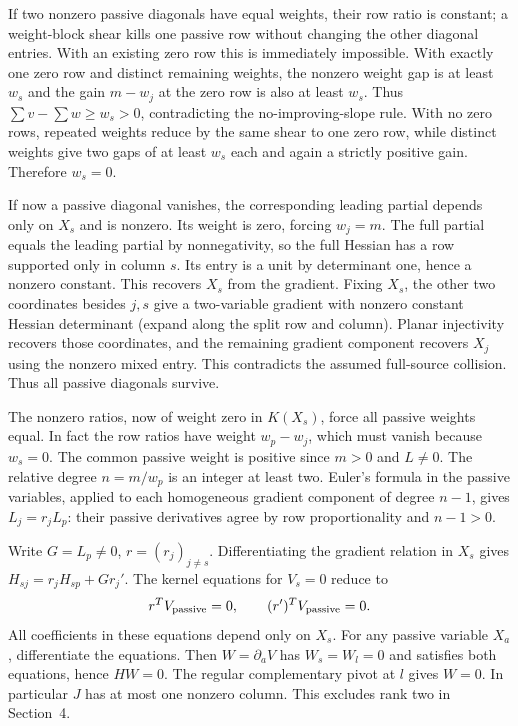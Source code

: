 \documentclass[11pt,a4paper]{article}
\begin{document}
If two nonzero passive diagonals have equal weights, their row ratio is constant; a weight-block shear kills one passive row without changing the other diagonal entries. With an existing zero row this is immediately impossible. With exactly one zero row and distinct remaining weights, the nonzero weight gap is at least $w_s$ and the gain $m-w_j$ at the zero row is also at least $w_s$. Thus $\sum v-\sum w\ge w_s>0$, contradicting the no-improving-slope rule. With no zero rows, repeated weights reduce by the same shear to one zero row, while distinct weights give two gaps of at least $w_s$ each and again a strictly positive gain. Therefore $w_s=0$.

If now a passive diagonal vanishes, the corresponding leading partial depends only on $X_s$ and is nonzero. Its weight is zero, forcing $w_j=m$. The full partial equals the leading partial by nonnegativity, so the full Hessian has a row supported only in column $s$. Its entry is a unit by determinant one, hence a nonzero constant. This recovers $X_s$ from the gradient. Fixing $X_s$, the other two coordinates besides $j,s$ give a two-variable gradient with nonzero constant Hessian determinant (expand along the split row and column). Planar injectivity recovers those coordinates, and the remaining gradient component recovers $X_j$ using the nonzero mixed entry. This contradicts the assumed full-source collision. Thus all passive diagonals survive.

The nonzero ratios, now of weight zero in $K(X_s)$, force all passive weights equal. In fact the row ratios have weight $w_p-w_j$, which must vanish because $w_s=0$. The common passive weight is positive since $m>0$ and $L\ne0$. The relative degree $n=m/w_p$ is an integer at least two. Euler's formula in the passive variables, applied to each homogeneous gradient component of degree $n-1$, gives $L_j=r_j L_p$: their passive derivatives agree by row proportionality and $n-1>0$. 

Write $G=L_p\ne0$, $r=(r_j)_{j\ne s}$. Differentiating the gradient relation in $X_s$ gives $H_{sj}=r_jH_{sp}+G r_j'$. The kernel equations for $V_s=0$ reduce to
\[
 r^TV_{\rm passive}=0,\qquad (r')^TV_{\rm passive}=0.
\]
All coefficients in these equations depend only on $X_s$. For any passive variable $X_a$, differentiate the equations. Then $W=\partial_a V$ has $W_s=W_l=0$ and satisfies both equations, hence $HW=0$. The regular complementary pivot at $l$ gives $W=0$. In particular $J$ has at most one nonzero column. This excludes rank two in Section~4.
\end{document}
